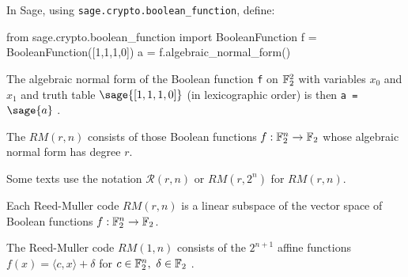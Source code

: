 \begin{example}
In Sage, using \verb!sage.crypto.boolean_function!, define:
\begin{sageblock}
from sage.crypto.boolean_function import BooleanFunction
f = BooleanFunction([1,1,1,0])
a = f.algebraic_normal_form()
\end{sageblock}
The algebraic normal form of the Boolean function \verb!f! on $\mathbb{F}_2^2$
with variables $x_0$ and $x_1$ and truth table $\sage{[1,1,1,0]}$ (in lexicographic order)
is then \verb!a = !$\sage{a}$
\cite[Boolean Functions]{SageMath8418}.
\end{example}

\begin{Definition}
\label{def-Reed-Muller-codes}
\cite{Mul54} \cite[Ch. 13, Section 3]{MacS77} \cite[10.5.2]{Sti07combinatorial}
The  $RM(r, n)$ consists of those Boolean functions $f : \mathbb{F}_2^n \rightarrow \mathbb{F}_2$
whose algebraic normal form has degree $r$.
\end{Definition}
\begin{remark}
Some texts use the notation $\mathcal{R}(r,n)$ or $RM(r,2^n)$ for $RM(r,n)$.

Each Reed-Muller code $RM(r,n)$ is a linear subspace of the vector space of Boolean functions $f : \mathbb{F}_2^n \rightarrow \mathbb{F}_2$.

The Reed-Muller code $RM(1,n)$ consists of the $2^{n+1}$ affine functions $f(x) = \langle c, x \rangle + \delta$
for $c \in \mathbb{F}_2^n,\ \delta \in \mathbb{F}_2$ \cite[Ch 14, Section 3]{MacS77} \cite[10.5.2]{Sti07combinatorial}.
\end{remark}



